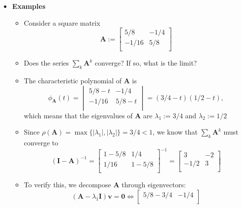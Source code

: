 \documentclass[12pt,a4paper]{article}
\begin{document}
\begin{itemize}
\item \textbf{Examples}
  \begin{itemize}
  \item Consider a square matrix
    \begin{equation}\nonumber%
      \bm{A} :=
      \begin{bmatrix}
        5/8 & -1/4 \\
        -1/16 & 5/8 \\
      \end{bmatrix}
    \end{equation}
  \item Does the series $\sum_{k}\bm{A}^{k}$ converge? If so, what is the limit?
  \item The characteristic polynomial of $\bm{A}$ is
    \begin{equation}\nonumber%
      \phi_{\bm{A}}(t) = 
      \begin{vmatrix}
        5/8 - t & -1/4 \\
        -1/16 & 5/8 - t \\
      \end{vmatrix}
      = (3/4-t)(1/2-t),
    \end{equation}
    which means that
    the eigenvalues of $\bm{A}$ are $\lambda_{1}:=3/4$ and $\lambda_{2}:=1/2$
  \item Since $\rho(\bm{A}) = \max\{|\lambda_{1}|,|\lambda_{2}|\} = 3/4 < 1$,
    we know that $\sum_{k}\bm{A}^{k}$ must converge to
    \begin{equation}\nonumber%
      (\bm{I}-\bm{A})^{-1}
      =
      \begin{bmatrix}
        1 - 5/8 & 1/4 \\
        1/16 & 1 - 5/8 \\
      \end{bmatrix}^{-1}
      =
      \begin{bmatrix}
        3 & -2 \\
        -1/2 & 3 \\
      \end{bmatrix}
    \end{equation}
  \item To verify this, 
    we decompose $\bm{A}$ through eigenvectors:
    \begin{equation}\nonumber%
      (\bm{A}-\lambda_{1}\bm{I})\bm{v}
      = \bm{0}
      \iff
      \begin{bmatrix}
        5/8 - 3/4 & - 1/4 \\

\end{bmatrix}
\end{equation}
\end{itemize}
\end{itemize}
\end{document}
